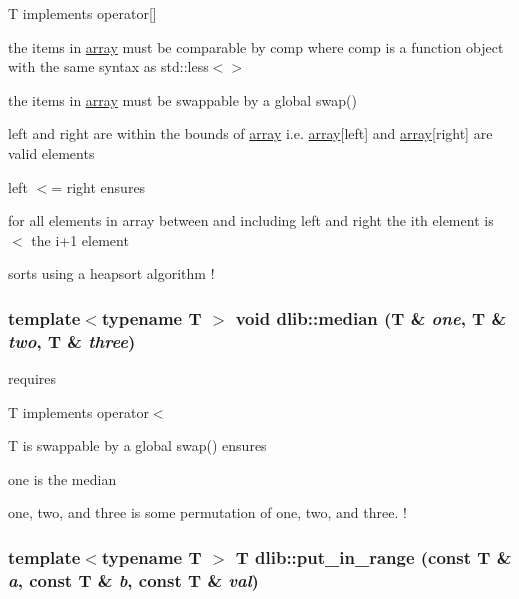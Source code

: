 \begin{DoxyItemize}
\item T implements operator\mbox{[}\mbox{]}
\item the items in \hyperlink{classdlib_1_1array}{array} must be comparable by comp where comp is a function object with the same syntax as std::less$<$$>$
\item the items in \hyperlink{classdlib_1_1array}{array} must be swappable by a global swap()
\item left and right are within the bounds of \hyperlink{classdlib_1_1array}{array} i.e. \hyperlink{classdlib_1_1array}{array}\mbox{[}left\mbox{]} and \hyperlink{classdlib_1_1array}{array}\mbox{[}right\mbox{]} are valid elements
\item left $<$= right ensures
\item for all elements in array between and including left and right the ith element is $<$ the i+1 element
\item sorts using a heapsort algorithm ! 
\end{DoxyItemize}\hypertarget{namespacedlib_af2608709700ae61f169fd4687e406267}{
\subsubsection[{median}]{\setlength{\rightskip}{0pt plus 5cm}template$<$typename T $>$ void dlib::median (T \& {\em one}, \/  T \& {\em two}, \/  T \& {\em three})}}
\label{namespacedlib_af2608709700ae61f169fd4687e406267}
requires
\begin{DoxyItemize}
\item T implements operator$<$
\item T is swappable by a global swap() ensures
\item one is the median
\item one, two, and three is some permutation of one, two, and three. ! 
\end{DoxyItemize}\hypertarget{namespacedlib_a36bcf970b14e81d1c300283a52d64142}{
\subsubsection[{put\_\-in\_\-range}]{\setlength{\rightskip}{0pt plus 5cm}template$<$typename T $>$ T dlib::put\_\-in\_\-range (const T \& {\em a}, \/  const T \& {\em b}, \/  const T \& {\em val})}}
